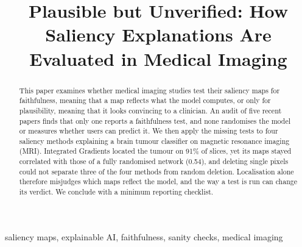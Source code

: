 \documentclass[conference]{IEEEtran}
\begin{document}
\title{Plausible but Unverified: How Saliency Explanations
Are Evaluated in Medical Imaging}

\author{
\and
{}
\and
{}
\and
{}
}

\maketitle

\begin{abstract}
This paper examines whether medical imaging studies test their saliency
maps for faithfulness, meaning that a map reflects what the model computes,
or only for plausibility, meaning that it looks convincing to a clinician.
An audit of five recent papers finds that only one reports a faithfulness
test, and none randomises the model or measures whether users can predict
it. We then apply the missing tests to four saliency methods explaining a
brain tumour classifier on magnetic resonance imaging (MRI). Integrated
Gradients located the tumour on 91\% of slices, yet its maps stayed
correlated with those of a fully randomised network (0.54), and deleting
single pixels could not separate three of the four methods from random
deletion. Localisation alone therefore misjudges which maps reflect the
model, and the way a test is run can change its verdict. We conclude with a
minimum reporting checklist.
\end{abstract}

\begin{IEEEkeywords}
saliency maps, explainable AI, faithfulness, sanity checks, medical imaging
\end{IEEEkeywords}
\end{document}

